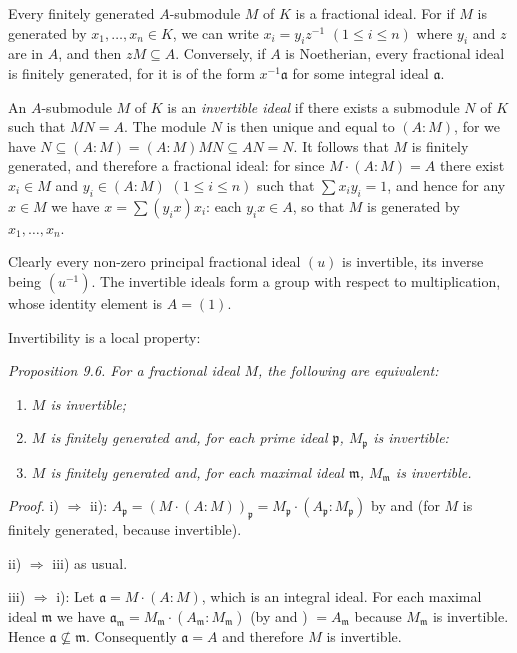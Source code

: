 Every finitely generated $A$-submodule $M$ of $K$ is a fractional ideal. For if $M$ is generated by $x_1,\ldots,x_n\in K$, we can write $x_i=y_iz^{-1}$ $(1\leq i\leq n)$ where $y_i$ and $z$ are in $A$, and then $zM\subseteq A$. Conversely, if $A$ is Noetherian, every fractional ideal is finitely generated, for it is of the form $x^{-1}\mathfrak a$ for some integral ideal $\mathfrak a$.

An $A$-submodule $M$ of $K$ is an \textit{invertible ideal} if there exists a submodule $N$ of $K$ such that $MN=A$. The module $N$ is then unique and equal to $(A:M)$, for we have $N\subseteq(A:M)=(A:M)MN\subseteq AN=N$. It follows that $M$ is finitely generated, and therefore a fractional ideal: for since $M\cdot(A:M)=A$ there exist $x_i\in M$ and $y_i\in(A:M)$ $(1\leq i\leq n)$ such that $\sum x_iy_i=1$, and hence for any $x\in M$ we have $x=\sum(y_ix)x_i$: each $y_ix\in A$, so that $M$ is generated by $x_1,\ldots,x_n$.

Clearly every non-zero principal fractional ideal $(u)$ is invertible, its inverse being $(u^{-1})$. The invertible ideals form a group with respect to multiplication, whose identity element is $A=(1)$.

Invertibility is a local property:

\noindent\textit{Proposition 9.6. For a fractional ideal $M$, the following are equivalent:}
\begin{enumerate}
\renewcommand{\labelenumi}{\roman{enumi})}
\item \textit{$M$ is invertible;}
\item \textit{$M$ is finitely generated and, for each prime ideal $\mathfrak p$, $M_{\mathfrak p}$ is invertible:}
\item \textit{$M$ is finitely generated and, for each maximal ideal $\mathfrak m$, $M_{\mathfrak m}$ is invertible.}
\end{enumerate}

\noindent\textit{Proof.} i) $\Rightarrow$ ii): $A_{\mathfrak p}=(M\cdot(A:M))_{\mathfrak p}=M_{\mathfrak p}\cdot(A_{\mathfrak p}:M_{\mathfrak p})$ by  and  (for $M$ is finitely generated, because invertible).

ii) $\Rightarrow$ iii) as usual.

iii) $\Rightarrow$ i): Let $\mathfrak a=M\cdot(A:M)$, which is an integral ideal. For each maximal ideal $\mathfrak m$ we have $\mathfrak a_{\mathfrak m}=M_{\mathfrak m}\cdot(A_{\mathfrak m}:M_{\mathfrak m})$ (by  and ) $=A_{\mathfrak m}$ because $M_{\mathfrak m}$ is invertible. Hence $\mathfrak a\nsubseteq\mathfrak m$. Consequently $\mathfrak a=A$ and therefore $M$ is invertible. \proofbox

